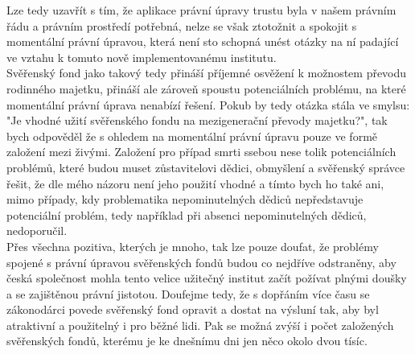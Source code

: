 \documentclass{article}
\begin{document}
Lze tedy uzavřít s tím, že aplikace právní úpravy trustu byla v našem právním řádu a právním prostředí potřebná, nelze se však ztotožnit a spokojit s momentální právní úpravou, která není sto schopná unést otázky na ní padající ve vztahu k tomuto nově implementovanému institutu.\\

Svěřenský fond jako takový tedy přináší příjemné osvěžení k možnostem převodu rodinného majetku, přináší ale zároveň spoustu potenciálních problému, na které momentální právní úprava nenabízí řešení. Pokub by tedy otázka stála ve smylsu: "Je vhodné užití svěřenského fondu na mezigenerační převody majetku?", tak bych odpověděl že s ohledem na momentální právní úpravu pouze ve formě založení mezi živými. Založení pro případ smrti ssebou nese tolik potenciálních problémů, které budou muset zůstavitelovi dědici, obmyšlení a svěřenský správce řešit, že dle mého názoru není jeho použití vhodné a tímto bych ho také ani, mimo případy, kdy problematika nepominutelných dědiců nepředstavuje potenciální problém, tedy například při absenci nepominutelných dědiců, nedoporučil.\\

Přes všechna pozitiva, kterých je mnoho, tak lze pouze doufat, že problémy spojené s právní úpravou svěřenských fondů budou co nejdříve odstraněny, aby česká společnost mohla tento velice užitečný institut začít požívat plnými doušky a se zajištěnou právní jistotou. Doufejme tedy, že s dopřáním více času se zákonodárci povede svěřenský fond opravit a dostat na výsluní tak, aby byl atraktivní a použitelný i pro běžné lidi. Pak se možná zvýší i počet založených svěřenských fondů, kterému je ke dnešnímu dni jen něco okolo dvou tísíc.\\


\end{document}
